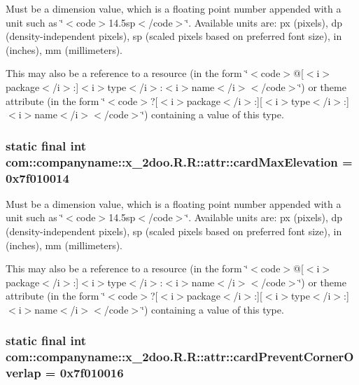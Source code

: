 Must be a dimension value, which is a floating point number appended with a unit such as \char`\"{}$<$code$>$14.5sp$<$/code$>$\char`\"{}. Available units are: px (pixels), dp (density-independent pixels), sp (scaled pixels based on preferred font size), in (inches), mm (millimeters). 

This may also be a reference to a resource (in the form \char`\"{}$<$code$>$@\mbox{[}$<$i$>$package$<$/i$>$:\mbox{]}$<$i$>$type$<$/i$>$:$<$i$>$name$<$/i$>$$<$/code$>$\char`\"{}) or theme attribute (in the form \char`\"{}$<$code$>$?\mbox{[}$<$i$>$package$<$/i$>$:\mbox{]}\mbox{[}$<$i$>$type$<$/i$>$:\mbox{]}$<$i$>$name$<$/i$>$$<$/code$>$\char`\"{}) containing a value of this type. \hypertarget{classcom_1_1companyname_1_1x__2doo_1_1_r_1_1attr_bd9f7dee965db0b4fd87b4336bc771a3}{
\subsubsection[{cardMaxElevation}]{\setlength{\rightskip}{0pt plus 5cm}static final int com::companyname::x\_\-2doo.R.R::attr::cardMaxElevation = 0x7f010014}}
\label{classcom_1_1companyname_1_1x__2doo_1_1_r_1_1attr_bd9f7dee965db0b4fd87b4336bc771a3}


Must be a dimension value, which is a floating point number appended with a unit such as \char`\"{}$<$code$>$14.5sp$<$/code$>$\char`\"{}. Available units are: px (pixels), dp (density-independent pixels), sp (scaled pixels based on preferred font size), in (inches), mm (millimeters). 

This may also be a reference to a resource (in the form \char`\"{}$<$code$>$@\mbox{[}$<$i$>$package$<$/i$>$:\mbox{]}$<$i$>$type$<$/i$>$:$<$i$>$name$<$/i$>$$<$/code$>$\char`\"{}) or theme attribute (in the form \char`\"{}$<$code$>$?\mbox{[}$<$i$>$package$<$/i$>$:\mbox{]}\mbox{[}$<$i$>$type$<$/i$>$:\mbox{]}$<$i$>$name$<$/i$>$$<$/code$>$\char`\"{}) containing a value of this type. \hypertarget{classcom_1_1companyname_1_1x__2doo_1_1_r_1_1attr_a246ec9ea6bfd12fc5958b02b82bc54a}{
\subsubsection[{cardPreventCornerOverlap}]{\setlength{\rightskip}{0pt plus 5cm}static final int com::companyname::x\_\-2doo.R.R::attr::cardPreventCornerOverlap = 0x7f010016}}
\label{classcom_1_1companyname_1_1x__2doo_1_1_r_1_1attr_a246ec9ea6bfd12fc5958b02b82bc54a}


